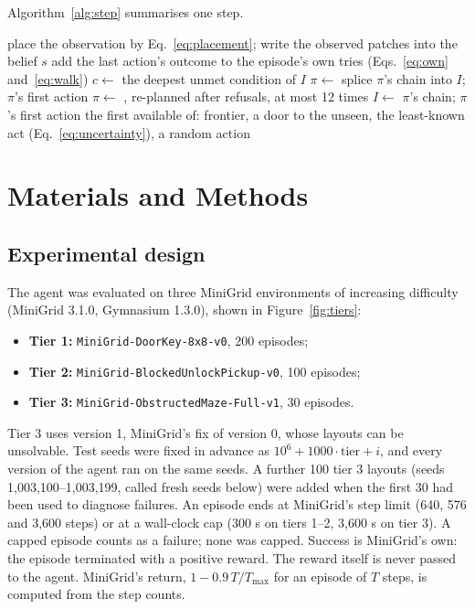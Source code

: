 \documentclass{article}
\begin{document}
Algorithm~\ref{alg:step} summarises one step.

\begin{algorithm}[t]
\caption{One step of the conditional agent}
\label{alg:step}
\begin{algorithmic}[1]
\State place the observation by Eq.~\eqref{eq:placement}; write the observed patches into the belief $s$
\State add the last action's outcome to the episode's own tries (Eqs.~\eqref{eq:own} and~\eqref{eq:walk})
    \State $c\gets$ the deepest unmet condition of $I$
    \State $\pi\gets$ 
        \State splice $\pi$'s chain into $I$; \Return $\pi$'s first action
    \EndIf
\EndIf
\State $\pi\gets$ , re-planned after refusals, at most 12 times
    \State $I\gets$ $\pi$'s chain; \Return $\pi$'s first action
\EndIf
\State \Return the first available of: frontier, a door to the unseen, the least-known act (Eq.~\eqref{eq:uncertainty}), a random action
\end{algorithmic}
\end{algorithm}

\section{Materials and Methods}

\subsection{Experimental design}

The agent was evaluated on three MiniGrid environments of increasing difficulty \cite{ChevalierBoisvert2023} (MiniGrid 3.1.0, Gymnasium 1.3.0), shown in Figure~\ref{fig:tiers}:
\begin{itemize}
    \item \textbf{Tier 1:} \texttt{MiniGrid-DoorKey-8x8-v0}, 200 episodes;
    \item \textbf{Tier 2:} \texttt{MiniGrid-BlockedUnlockPickup-v0}, 100 episodes;
    \item \textbf{Tier 3:} \texttt{MiniGrid-ObstructedMaze-Full-v1}, 30 episodes.
\end{itemize}
Tier 3 uses version 1, MiniGrid's fix of version 0, whose layouts can be unsolvable. Test seeds were fixed in advance as $10^6+1000\cdot\text{tier}+i$, and every version of the agent ran on the same seeds. A further 100 tier 3 layouts (seeds 1,003,100--1,003,199, called fresh seeds below) were added when the first 30 had been used to diagnose failures. An episode ends at MiniGrid's step limit (640, 576 and 3,600 steps) or at a wall-clock cap (300 s on tiers 1--2, 3,600 s on tier 3). A capped episode counts as a failure; none was capped. Success is MiniGrid's own: the episode terminated with a positive reward. The reward itself is never passed to the agent. MiniGrid's return, $1-0.9\,T/T_{\max}$ for an episode of $T$ steps, is computed from the step counts.
\end{document}

